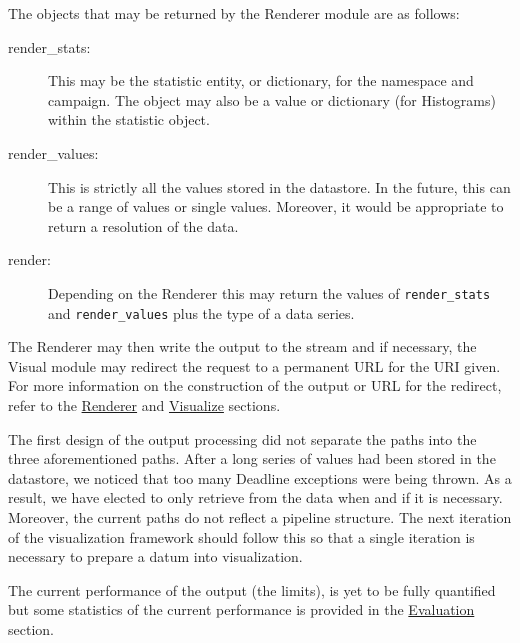 \documentclass[10pt,a4paper,english]{article}
\begin{document}
The objects that may be returned by the Renderer module are as follows:
\begin{description}
\item[{render{\_}stats:}] \leavevmode 
This may be the statistic entity, or dictionary, for the namespace and campaign. The object may also be a value or dictionary (for Histograms) within the statistic object.

\item[{render{\_}values:}] \leavevmode 
This is strictly all the values stored in the datastore. In the future, this can be a range of values or single values. Moreover, it would be appropriate to return a resolution of the data.

\item[{render:}] \leavevmode 
Depending on the Renderer this may return the values of \texttt{render{\_}stats} and \texttt{render{\_}values} plus the type of a data series.

\end{description}

The Renderer may then write the output to the stream and if necessary, the Visual module may redirect the request to a permanent URL for the URI given. For more information on the construction of the output or URL for the redirect, refer to the \href{\#renderer}{Renderer} and \href{\#visualize}{Visualize} sections.

The first design of the output processing did not separate the paths into the three aforementioned paths. After a long series of values had been stored in the datastore, we noticed that too many Deadline exceptions were being thrown. As a result, we have elected to only retrieve from the data when and if it is necessary. Moreover, the current paths do not reflect a pipeline structure. The next iteration of the visualization framework should follow this so that a single iteration is necessary to prepare a datum into visualization.

The current performance of the output (the limits), is yet to be fully quantified but some statistics of the current performance is provided in the \href{\#evaluation}{Evaluation} section.


\pagebreak{}




\hypertarget{evaluation}{}
\end{document}
